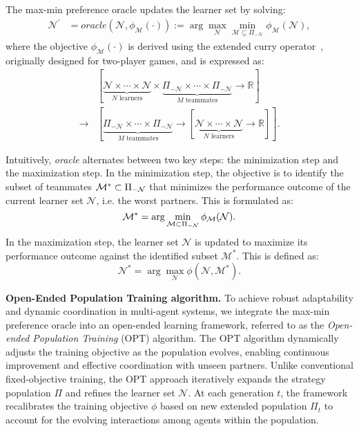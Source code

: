 The max-min preference oracle updates the learner set by solving:
\begin{equation}
\begin{aligned}
    \mathcal{N}^\prime &= oracle(\mathcal{N}, \phi_{\mathcal{M}}(\cdot)) := \arg\max_{\mathcal{N}} \min_{\mathcal{M} \subseteq \Pi_{-\mathcal{N}}} \phi_\mathcal{M}(\mathcal{N}),
\end{aligned}
\end{equation}
where the objective \(\phi_{\mathcal{M}}(\cdot)\) is derived using the extended curry operator~\cite{balduzzi2019open}, originally designed for two-player games, and is expressed as:
\begin{equation}
\begin{aligned}
    &\left[\underbrace{\mathcal{N} \times \cdots \times \mathcal{N}}_{N \text{ learners}} \times \underbrace{\Pi_{-\mathcal{N}} \times \cdots \times \Pi_{-\mathcal{N}}}_{M \text{ teammates}} \rightarrow \mathbb{R} \right] \\
    \rightarrow &\left[
    \underbrace{\Pi_{-\mathcal{N}} \times \cdots \times \Pi_{-\mathcal{N}}}_{M \text{ teammates}} \rightarrow
    \left[
    \underbrace{\mathcal{N} \times \cdots \times \mathcal{N}}_{N \text{ learners}} \rightarrow \mathbb{R}
    \right]
    \right].
\end{aligned}
\end{equation}

Intuitively, \textit{oracle} alternates between two key steps: the minimization step and the maximization step. In the minimization step, the objective is to identify the subset of teammates \( \mathcal{M}^* \subset \Pi_{-{\mathcal{N}}} \) that minimizes the performance outcome of the current learner set \( \mathcal{N} \), i.e. the worst partners. This is formulated as:  
\[
\mathcal{M}^* = \arg\min_{\mathcal{M} \subset \Pi_{-{\mathcal{N}}}} \phi_\mathcal{M}(\mathcal{N}).
\]  
In the maximization step, the learner set \( \mathcal{N} \) is updated to maximize its performance outcome against the identified subset \( \mathcal{M}^* \). This is defined as:  
\[
\mathcal{N}^* = \arg\max_{\mathcal{N}} \phi(\mathcal{N}, \mathcal{M}^*).
\]  

\textbf{Open-Ended Population Training algorithm. }
To achieve robust adaptability and dynamic coordination in multi-agent systems, we integrate the max-min preference oracle into an open-ended learning framework, referred to as the \textit{Open-ended Population Training} (OPT) algorithm. 
The OPT algorithm dynamically adjusts the training objective as the population evolves, enabling continuous improvement and effective coordination with unseen partners.
Unlike conventional fixed-objective training, the OPT approach iteratively expands the strategy population \(\Pi\) and refines the learner set \(\mathcal{N}\). At each generation $t$, the framework recalibrates the training objective \(\phi\) based on new extended population $\Pi_t$ to account for the evolving interactions among agents within the population. 

